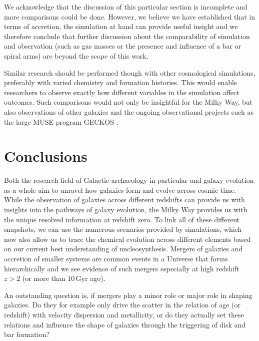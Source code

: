 \documentclass[fleqn,usenatbib]{mnras}
\begin{document}
We acknowledge that the discussion of this particular section is incomplete and more comparisons could be done. However, we believe we have established that in terms of accretion, the simulation at hand can provide useful insight and we therefore conclude that further discussion about the comparability of simulation and observation (such as gas masses or the presence and influence of a bar or spiral arms) are beyond the scope of this work.

Similar research should be performed though with other cosmological simulations, preferably with varied chemistry and formation histories. This would enable researchers to observe exactly how different variables in the simulation affect outcomes. Such comparisons would not only be insightful for the Milky Way, but also observations of other galaxies \citep[compare for example figures by][to our Fig.~\ref{fig:accretion_rate}]{Pinna2019, Pinna2019b, Martig2021} and the ongoing observational projects such as the large MUSE program GECKOS \citep{GECKOS2023}.

\section{Conclusions}
\label{sec:conc}

Both the research field of Galactic archaeology in particular and galaxy evolution as a whole aim to unravel how galaxies form and evolve across cosmic time. While the observation of galaxies across different redshifts can provide us with insights into the pathways of galaxy evolution, the Milky Way provides us with the unique resolved information at redshift zero. To link all of these different snapshots, we can use the numerous scenarios provided by simulations, which now also allow us to trace the chemical evolution across different elements based on our current best understanding of nucleosynthesis. Mergers of galaxies and accretion of smaller systems are common events in a Universe that forms hierarchically and we see evidence of such mergers especially at high redshift $z > 2$ (or more than $10\,\mathrm{Gyr}$ ago).

An outstanding question is, if mergers play a minor role or major role in shaping galaxies. Do they for example only drive the scatter in the relation of age (or redshift) with velocity dispersion and metallicity, or do they actually set these relations and influence the shape of galaxies through the triggering of disk and bar formation?
\end{document}
